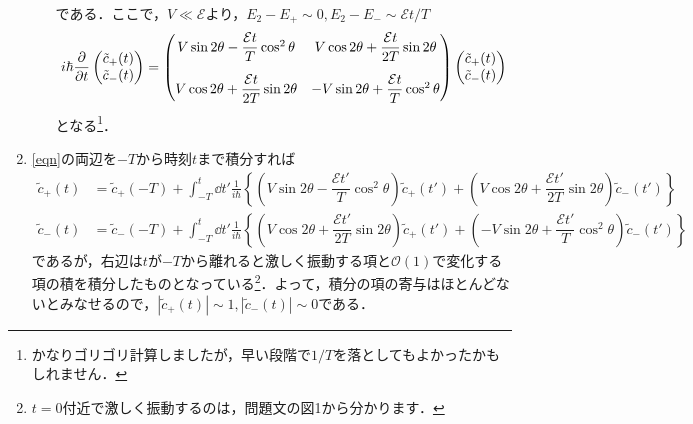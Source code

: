 \documentclass[a4paper,pdflatex,ja=standard]{bxjsarticle}
\begin{document}
\begin{enumerate}
\begin{enumerate}
\begin{align}
    \end{align}
    である．ここで，$V\ll\mathcal{E}$より，$E_2-E_+\sim 0, E_2-E_-\sim \mathcal{E}t/T$
    \begin{equation}
      i\hbar\pdv{}{t}
      \begin{pmatrix}
        \tilde{c}_{+}(t) \\
        \tilde{c}_{-}(t)
      \end{pmatrix}      
      =
      \begin{pmatrix}
        V\sin2\theta - \dfrac{\mathcal{E} t}{T}\cos^2\theta
        &
        V\cos2\theta + \dfrac{\mathcal{E} t}{2T}\sin2\theta
        \vphantom{\frac{\frac{1}{2}}{2}}
        \\
        V\cos2\theta + \dfrac{\mathcal{E} t}{2T}\sin2\theta
        &
        -V\sin2\theta + \dfrac{\mathcal{E} t}{T}\cos^2\theta        
        \vphantom{\frac{\dfrac{1}{2}}{2}}
      \end{pmatrix}
      \begin{pmatrix}
        \tilde{c}_{+}(t) \\
        \tilde{c}_{-}(t)
      \end{pmatrix}
      \label{eqn}
    \end{equation}
    となる\footnote{
      かなりゴリゴリ計算しましたが，早い段階で$1/T$を落としてもよかったかもしれません．
    }．

  \end{enumerate}

  \item 

  \eqref{eqn}の両辺を$-T$から時刻$t$まで積分すれば
  \begin{align}
        \tilde{c}_{+}(t)
        &=        
        \tilde{c}_{+}(-T)
        +
        \int_{-T}^{t}
        \dd t'
        \frac{1}{i\hbar}
        \left\{  
          \left(  
            V\sin2\theta - \dfrac{\mathcal{E} t'}{T}\cos^2\theta
          \right)
          \tilde{c}_{+}(t')
          +
          \left( 
            V\cos2\theta + \dfrac{\mathcal{E} t'}{2T}\sin2\theta
          \right)
          \tilde{c}_{-}(t')
        \right\}
        \\
        \tilde{c}_{-}(t)
        &=
        \tilde{c}_{-}(-T)
        +
        \int_{-T}^{t}
        \dd t'
        \frac{1}{i\hbar}
        \left\{  
          \left(  
            V\cos2\theta + \dfrac{\mathcal{E} t'}{2T}\sin2\theta
          \right)
          \tilde{c}_{+}(t')
          +
          \left( 
            -V\sin2\theta + \dfrac{\mathcal{E} t'}{T}\cos^2\theta
          \right)
          \tilde{c}_{-}(t')
        \right\}
  \end{align}
  であるが，右辺は$t$が$-T$から離れると激しく振動する項と$\mathcal{O}(1)$で変化する項の積を積分したものとなっている\footnote{
    $t=0$付近で激しく振動するのは，問題文の図1から分かります．
  }．よって，積分の項の寄与はほとんどないとみなせるので，$|\tilde{c}_{+}(t)|\sim 1, |\tilde{c}_{-}(t)|\sim 0$である．

\end{enumerate}
\end{document}
